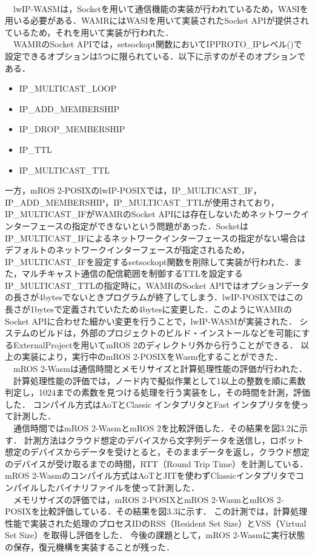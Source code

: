 \\　lwIP-WASMは，Socketを用いて通信機能の実装が行われているため，WASIを用いる必要がある．WAMRにはWASIを用いて実装されたSocket APIが提供されているため，それを用いて実装が行われた．
\\　WAMRのSocket APIでは，setsockopt関数においてIPPROTO\_IPレベル()で設定できるオプションは5つに限られている．以下に示すのがそのオプションである．
\begin{itemize}
    \item IP\_MULTICAST\_LOOP
    \item IP\_ADD\_MEMBERSHIP
    \item IP\_DROP\_MEMBERSHIP
    \item IP\_TTL
    \item IP\_MULTICAST\_TTL
\end{itemize}
一方，mROS 2-POSIXのlwIP-POSIXでは，IP\_MULTICAST\_IF，IP\_ADD\_MEMBERSHIP，IP\_MULTICAST\_TTLが使用されており，IP\_MULTICAST\_IFがWAMRのSocket APIには存在しないためネットワークインターフェースの指定ができないという問題があった．SocketはIP\_MULTICAST\_IFによるネットワークインターフェースの指定がない場合はデフォルトのネットワークインターフェースが指定されるため，IP\_MULTICAST\_IFを設定するsetsockopt関数を削除して実装が行われた．また，マルチキャスト通信の配信範囲を制御するTTLを設定するIP\_MULTICAST\_TTLの指定時に，WAMRのSocket APIではオプションデータの長さが4bytesでないときプログラムが終了してしまう．lwIP-POSIXではこの長さが1bytesで定義されていたため4bytesに変更した．このようにWAMRのSocket APIに合わせた細かい変更を行うことで，lwIP-WASMが実装された．
システムのビルドは，外部のプロジェクトのビルド・インストールなどを可能にするExternalProjectを用いてmROS 2のディレクトリ外から行うことができる．
以上の実装により，実行中のmROS 2-POSIXをWasm化することができた．
\\　mROS 2-Wasmは通信時間とメモリサイズと計算処理性能の評価が行われた．
\\　計算処理性能の評価では，ノード内で擬似作業として1以上の整数を順に素数判定し，1024までの素数を見つける処理を行う実装をし，その時間を計測，評価した．
コンパイル方式はAoTとClassic インタプリタとFast インタプリタを使って計測した．
\\　通信時間ではmROS 2-WasmとmROS 2を比較評価した．その結果を図3.2に示す．
計測方法はクラウド想定のデバイスから文字列データを送信し，ロボット想定のデバイスからデータを受けとると，そのままデータを返し，クラウド想定のデバイスが受け取るまでの時間，RTT（Round Trip Time）を計測している．mROS 2-Wasmのコンパイル方式はAoTとJITを使わずClassicインタプリタでコンパイルしたバイナリファイルを使って計測した．
\\　メモリサイズの評価では，mROS 2-POSIXとmROS 2-WasmとmROS 2-POSIXを比較評価している．その結果を図3.3に示す．
この計測では，計算処理性能で実装された処理のプロセスIDのRSS（Resident Set Size）とVSS（Virtual Set Size）を取得し評価をした．
今後の課題として，mROS 2-Wasmに実行状態の保存，復元機構を実装することが残った．
